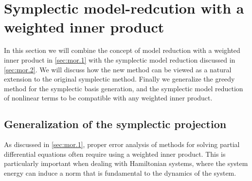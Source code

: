 \section{Symplectic model-redcution with a weighted inner product} \label{sec:normmor}

In this section we will combine the concept of model reduction with a weighted inner product in \cref{sec:mor.1} with the symplectic model reduction discussed in \cref{sec:mor.2}. We will discuss how the new method can be viewed as a natural extension to the original symplectic method. Finally we generalize the greedy method for the symplectic basis generation, and the symplectic model reduction of nonlinear terms to be compatible with any weighted inner product.

\subsection{Generalization of the symplectic projection} \label{sec:normmor.1}
As discussed in \cref{sec:mor.1}, proper error analysis of methods for solving partial differential equations often require using a weighted inner product. This is particularly important when dealing with Hamiltonian systems, where the system energy can induce a norm that is fundamental to the dynamics of the system.

